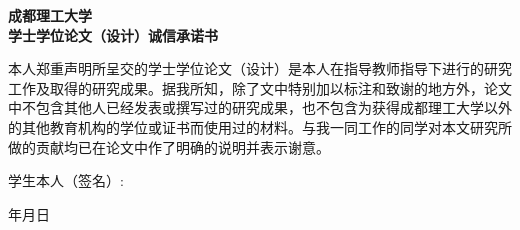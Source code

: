   \newpage
  \thispagestyle{empty}
  \vspace*{44pt}
  \begin{center}{\hei {} \textbf{成都理工大学\\
  \vspace{1cm}学士学位论文（设计）诚信承诺书}}\end{center}
  \par\vspace*{40pt}
  \setlength{\baselineskip}{23pt}
  {
  本人郑重声明所呈交的学士学位论文（设计）是本人在指导教师指导下进行的研究工作及取得的研究成果。据我所知，除了文中特别加以标注和致谢的地方外，论文中不包含其他人已经发表或撰写过的研究成果，也不包含为获得成都理工大学以外的其他教育机构的学位或证书而使用过的材料。与我一同工作的同学对本文研究所做的贡献均已在论文中作了明确的说明并表示谢意。
  \par \vspace*{88pt}
  \hfill \hei {} 学生本人（签名）: \hspace{3.5cm}\hfill \par
  \hfill \hei {} 年\hspace{1cm}月\hspace{1cm}日
  }

 \null
  \newpage
  \thispagestyle{empty}
  \cleardoublepage
